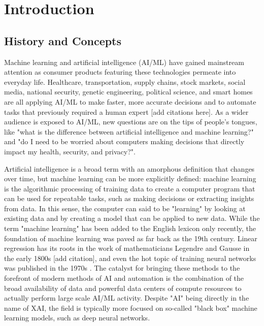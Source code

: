 \section{Introduction}

\subsection{History and Concepts}

Machine learning and artificial intelligence (AI/ML) have gained mainstream attention as consumer products featuring these technologies permeate into everyday life.  Healthcare, transportation, supply chains, stock markets, social media, national security, genetic engineering, political science, and smart homes are all applying AI/ML to make faster, more accurate decisions and to automate tasks that previously required a human expert [add citations here].  As a wider audience is exposed to AI/ML, new questions are on the tips of people's tongues, like "what is the difference between artificial intelligence and machine learning?" and "do I need to be worried about computers making decisions that directly impact my health, security, and privacy?".

Artificial intelligence is a broad term with an amorphous definition that changes over time, but machine learning can be more explicitly defined: machine learning is the algorithmic processing of training data to create a computer program that can be used for repeatable tasks, such as making decisions or extracting insights from data.  In this sense, the computer can said to be "learning" by looking at existing data and by creating a model that can be applied to new data.  While the term "machine learning" has been added to the English lexicon only recently, the foundation of machine learning was paved as far back as the 19th century.  Linear regression has its roots in the work of mathematicians Legendre and Gausse in the early 1800s [add citation], and even the hot topic of training neural networks was published in the 1970s \cite{Werbos1974}.  The catalyst for bringing these methods to the forefront of modern methods of AI and automation is the combination of the broad availability of data and powerful data centers of compute resources to actually perform large scale AI/ML activity.  Despite "AI" being directly in the name of XAI, the field is typically more focused on so-called "black box" machine learning models, such as deep neural networks.

